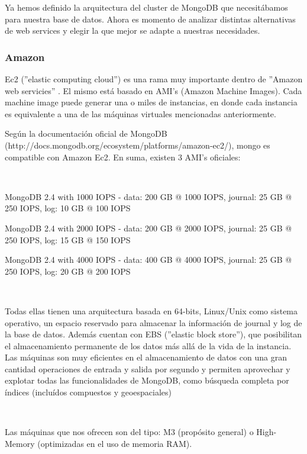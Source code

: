 Ya hemos definido la arquitectura del cluster de MongoDB que necesitábamos para nuestra base de datos. Ahora es
momento de analizar distintas alternativas de web services y elegir la que mejor se adapte a nuestras necesidades.

\subsubsection{Amazon}


Ec2 (''elastic computing cloud'') es una rama muy importante dentro de ''Amazon web servicies'' .
El mismo está basado en AMI's (Amazon Machine Images). Cada machine image puede generar una o miles de instancias,
en donde cada instancia es equivalente a una de las máquinas virtuales mencionadas anteriormente.


Según la documentación
oficial de MongoDB (http://docs.mongodb.org/ecosystem/platforms/amazon-ec2/), mongo es compatible con Amazon Ec2.
En suma, existen 3 AMI's oficiales: 

~

\begin{description}
	\item MongoDB 2.4 with 1000 IOPS - data: 200 GB @ 1000 IOPS, journal: 25 GB @ 250 IOPS, log: 10 GB @ 100 IOPS
	\item MongoDB 2.4 with 2000 IOPS - data: 200 GB @ 2000 IOPS, journal: 25 GB @ 250 IOPS, log: 15 GB @ 150 IOPS
	\item MongoDB 2.4 with 4000 IOPS - data: 400 GB @ 4000 IOPS, journal: 25 GB @ 250 IOPS, log: 20 GB @ 200 IOPS
\end{description}

~

Todas ellas tienen una arquitectura basada en 64-bits, Linux/Unix como sistema operativo, un espacio reservado
para almacenar la información de journal y log de la base de datos. Además cuentan con EBS (''elastic block store''),
que posibilitan el almacenamiento permanente de los datos más allá de la vida de la instancia. 
Las máquinas son muy eficientes en el almacenamiento de datos con una gran cantidad operaciones de entrada y salida
por segundo y permiten aprovechar y explotar todas las funcionalidades de MongoDB, como búsqueda completa por índices
(incluídos compuestos y geoespaciales)

~

Las máquinas que nos ofrecen son del tipo: M3 (propósito general) o High-Memory (optimizadas en el uso de memoria RAM).

